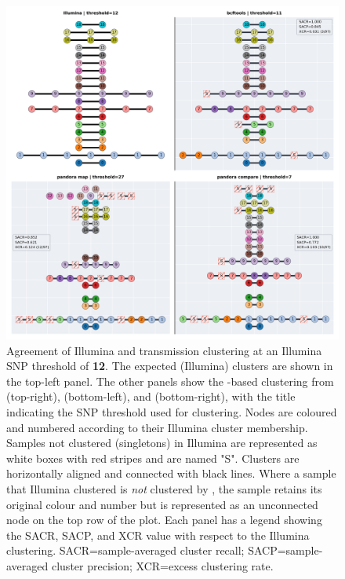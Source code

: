\begin{figure}
\begin{center}
\includegraphics[width=0.90\columnwidth]{Chapter2/Figs/clustering-t12.png}
\caption{{Agreement of Illumina and \ont{} transmission clustering at an Illumina SNP threshold of \textbf{12}. The expected (Illumina) clusters are shown in the top-left panel. The other panels show the \ont{}-based clustering from \bcftools{} (top-right), \map{} (bottom-left), and \compare{} (bottom-right), with the title indicating the SNP threshold used for clustering. Nodes are coloured and numbered according to their Illumina cluster membership. Samples not clustered (singletons) in Illumina are represented as white boxes with red stripes and are named "S". Clusters are horizontally aligned and connected with black lines. Where a sample that Illumina clustered is \emph{not} clustered by \ont{}, the sample retains its original colour and number but is represented as an unconnected node on the top row of the plot. Each \ont{} panel has a legend showing the SACR, SACP, and XCR value with respect to the Illumina clustering. SACR=sample-averaged cluster recall; SACP=sample-averaged cluster precision; XCR=excess clustering rate.
{\label{fig:clustering-t12}}
}}
\end{center}
\end{figure}

